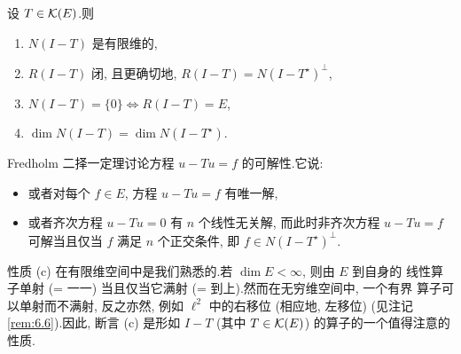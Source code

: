 \begin{keytheorem}
\label{thm:6.6}
设 $T\in\mathcal{K}(E)$.则
\begin{enumerate}[label=(\alph*), leftmargin=2.2em, itemsep=0.1em]
	\item $N(I-T)$ 是有限维的,
	\item $R(I-T)$ 闭, 且更确切地, $R(I-T)=N(I-T^\star)^\perp$,
	\item $N(I-T)=\{0\}\iff R(I-T)=E$,
	\item $\dim N(I-T)=\dim N(I-T^\star)$.
\end{enumerate}
\end{keytheorem}

\begin{remark}
\label{rem:6.4}
Fredholm 二择一定理讨论方程 $u-Tu=f$ 的可解性.它说:
\begin{itemize}[leftmargin=1.6em, itemsep=0.15em]
	\item 或者对每个 $f\in E$, 方程 $u-Tu=f$ 有唯一解,
	\item 或者齐次方程 $u-Tu=0$ 有 $n$ 个线性无关解, 而此时非齐次方程
	      $u-Tu=f$ 可解当且仅当 $f$ 满足 $n$ 个正交条件, 即
	      $f\in N(I-T^\star)^\perp$.
\end{itemize}
\end{remark}

\begin{remark}
\label{rem:6.5}
性质 (c) 在有限维空间中是我们熟悉的.若 $\dim E<\infty$, 则由 $E$ 到自身的
线性算子单射 (= 一一) 当且仅当它满射 (= 到上).然而在无穷维空间中, 一个有界
算子可以单射而不满射, 反之亦然, 例如 $\ell^2$ 中的右移位 (相应地, 左移位)
(见注记 \ref{rem:6.6}).因此, 断言 (c) 是形如 $I-T$ (其中 $T\in\mathcal{K}(E)$)
的算子的一个值得注意的性质.
\end{remark}

